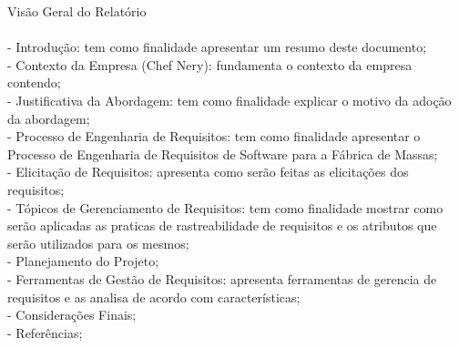 {\large{Visão Geral do Relatório}}\\ \\
\tab - Introdução: tem como finalidade apresentar um resumo deste documento;\\
\tab - Contexto da Empresa (Chef Nery): fundamenta o contexto da empresa contendo;\\
\tab - Justificativa da Abordagem: tem como finalidade explicar o motivo da adoção da abordagem;\\
\tab - Processo de Engenharia de Requisitos: tem como finalidade apresentar o Processo de Engenharia de Requisitos de Software para a Fábrica de Massas;\\
\tab - Elicitação de Requisitos: apresenta como serão feitas as elicitações dos requisitos;\\
\tab - Tópicos de Gerenciamento de Requisitos: tem como finalidade mostrar como serão aplicadas as praticas de rastreabilidade de requisitos e os atributos que serão utilizados para os mesmos;\\
\tab - Planejamento do Projeto;\\
\tab - Ferramentas de Gestão de Requisitos: apresenta ferramentas de gerencia de requisitos e as analisa de acordo com características;\\
\tab - Considerações Finais;\\
\tab - Referências;\\
